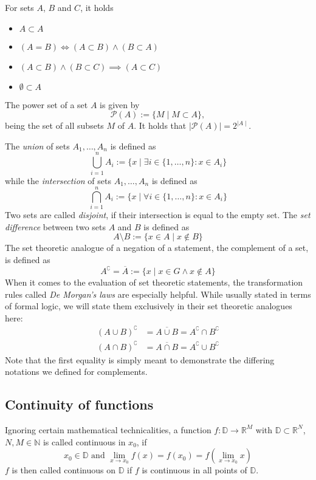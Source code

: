 \documentclass[12pt]{article}
\begin{document}
For sets $A$, $B$ and $C$, it holds
\begin{itemize}
\item $A \subset A$
\item $(A = B) \iff (A \subset B)\land (B \subset A)$
\item $(A \subset B) \land (B \subset C) \implies (A \subset C)$
\item $\emptyset \subset A$
\end{itemize}
The power set of a set $A$ is given by 
\[
\mathcal{P}(A) := \{M \mid M \subset A\},
\]
being the set of all subsets $M$ of $A$.
It holds that $\mid \mathcal{P}(A)\mid = 2^{ \mid A\mid}$.

The \textit{union} of sets $A_1, \dots , A_n$ is defined as
\[
\bigcup\limits_{i = 1}^{n} A_i := \{x \mid \exists i \in \{1, \dots , n\} : x \in A_i\}
\]
while the \textit{intersection} of sets $A_1, \dots , A_n$ is defined as
\[
\bigcap\limits_{i = 1}^{n} A_i := \{x \mid \forall i \in \{1, \dots , n\} : x \in A_i\}
\]
Two sets are called \textit{disjoint}, if their intersection is equal to the empty set.
The \textit{set difference} between two sets $A$ and $B$ is defined as 
\[
A\setminus B := \{x \in A \mid x \notin B\}
\]
The set theoretic analogue of a negation of a statement, the complement of a set, is defined as
\[
A^{\complement} = \overline{A} := \{x \mid x \in G \land x \notin A\}
\]
When it comes to the evaluation of set theoretic statements, the transformation rules called \textit{De Morgan's laws} are especially helpful. While usually stated in terms of formal logic, we will state them exclusively in their set theoretic analogues here:
\begin{align*}
(A \cup B)^\complement &= \overline{A \cup B} = A^\complement \cap B^\complement \\
(A \cap B)^\complement &= \overline{A \cap B} = A^\complement \cup B^\complement
\end{align*}
Note that the first equality is simply meant to demonstrate the differing notations we defined for complements.


\subsection{Continuity of functions}
Ignoring certain mathematical technicalities, a function $f : \mathbb{D} \to \mathbb{R}^M$ with $\mathbb{D} \subset \mathbb{R}^N$, $N, M \in \mathbb{N}$ is called continuous in $x_0$, if
\[
x_0 \in \mathbb{D} \text{ and } \lim_{x \to x_0} f(x) = f(x_0) = f(\lim_{x \to x_0} x)
\]
$f$ is then called continuous on $\mathbb{D}$ if $f$ is continuous in all points of $\mathbb{D}$.
\newpage
\end{document}
